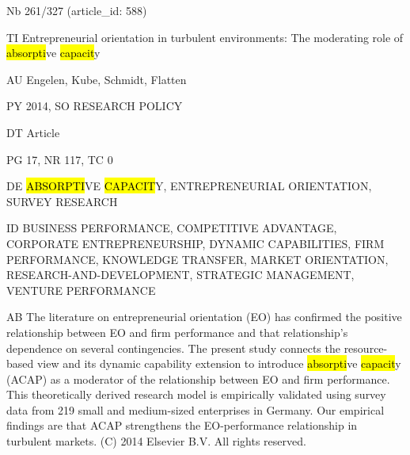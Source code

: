 \documentclass[a4paper]{article}
\begin{document}
\vspace*{-2cm}
Nb \tabto{0cm}261/327 (article\_id: 588)\par
TI \tabto{0cm}Entrepreneurial orientation in turbulent environments: The moderating role of \hl{absorpti}ve \hl{capacit}y\par
AU \tabto{0cm}Engelen, Kube, Schmidt, Flatten\par
PY \tabto{0cm}2014, SO RESEARCH POLICY\par
DT \tabto{0cm}Article\par
PG \tabto{0cm}17, NR 117, TC 0\par
DE \tabto{0cm}\hl{ABSORPTI}VE \hl{CAPACIT}Y, ENTREPRENEURIAL ORIENTATION, SURVEY RESEARCH\par
ID \tabto{0cm}BUSINESS PERFORMANCE, COMPETITIVE ADVANTAGE, CORPORATE ENTREPRENEURSHIP, DYNAMIC CAPABILITIES, FIRM PERFORMANCE, KNOWLEDGE TRANSFER, MARKET ORIENTATION, RESEARCH-AND-DEVELOPMENT, STRATEGIC MANAGEMENT, VENTURE PERFORMANCE\par
AB \tabto{0cm}The literature on entrepreneurial orientation (EO) has confirmed the positive relationship between EO and firm performance and that relationship's dependence on several contingencies. The present study connects the resource-based view and its dynamic capability extension to introduce \hl{absorpti}ve \hl{capacit}y (ACAP) as a moderator of the relationship between EO and firm performance. This theoretically derived research model is empirically validated using survey data from 219 small and medium-sized enterprises in Germany. Our empirical findings are that ACAP strengthens the EO-performance relationship in turbulent markets. (C) 2014 Elsevier B.V. All rights reserved.\par
\clearpage
\end{document}
